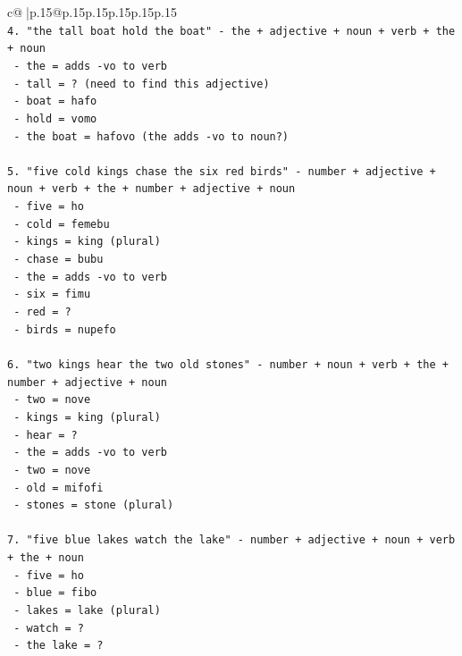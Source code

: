 \documentclass{article}
\begin{document}
{\begin{supertabular}{c@{$\;$}|p{.15\linewidth}@{}p{.15\linewidth}p{.15\linewidth}p{.15\linewidth}p{.15\linewidth}p{.15\linewidth}}
{{{\\ 
\texttt{4. "the tall boat hold the boat" {-} the + adjective + noun + verb + the + noun} \\
\texttt{   {-} the = adds {-}vo to verb} \\
\texttt{   {-} tall = ? (need to find this adjective)} \\
\texttt{   {-} boat = hafo} \\
\texttt{   {-} hold = vomo} \\
\texttt{   {-} the boat = hafovo (the adds {-}vo to noun?)} \\
\\ 
\texttt{5. "five cold kings chase the six red birds" {-} number + adjective + noun + verb + the + number + adjective + noun} \\
\texttt{   {-} five = ho} \\
\texttt{   {-} cold = femebu} \\
\texttt{   {-} kings = king (plural)} \\
\texttt{   {-} chase = bubu} \\
\texttt{   {-} the = adds {-}vo to verb} \\
\texttt{   {-} six = fimu} \\
\texttt{   {-} red = ?} \\
\texttt{   {-} birds = nupefo} \\
\\ 
\texttt{6. "two kings hear the two old stones" {-} number + noun + verb + the + number + adjective + noun} \\
\texttt{   {-} two = nove} \\
\texttt{   {-} kings = king (plural)} \\
\texttt{   {-} hear = ?} \\
\texttt{   {-} the = adds {-}vo to verb} \\
\texttt{   {-} two = nove} \\
\texttt{   {-} old = mifofi} \\
\texttt{   {-} stones = stone (plural)} \\
\\ 
\texttt{7. "five blue lakes watch the lake" {-} number + adjective + noun + verb + the + noun} \\
\texttt{   {-} five = ho} \\
\texttt{   {-} blue = fibo} \\
\texttt{   {-} lakes = lake (plural)} \\
\texttt{   {-} watch = ?} \\
\texttt{   {-} the lake = ?} \\
}}}
\end{supertabular}}
\end{document}
